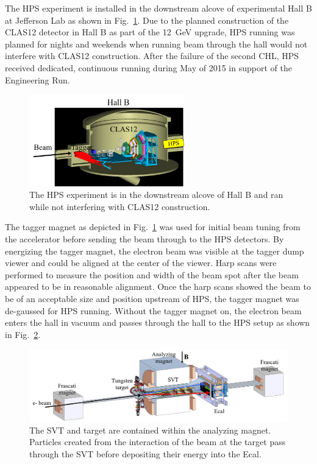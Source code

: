 The HPS experiment is installed in the downstream alcove of experimental Hall B at Jefferson Lab as shown in Fig.~\ref{Figure:hallB}. Due to the planned construction of the CLAS12 detector in Hall B as part of the 12~GeV upgrade, HPS running was planned for nights and weekends when running beam through the hall would not interfere with CLAS12 construction. After the failure of the second CHL, HPS received dedicated, continuous running during May of 2015 in support of the Engineering Run. 

\begin{figure}[H]
  \centering
      \includegraphics[width=0.6\textwidth]{pics/experiment/hallB.png}
  \caption[HPS location in Hall B]{The HPS experiment is in the downstream alcove of Hall B and ran while not interfering with CLAS12 construction.}
  \label{Figure:hallB}
\end{figure}

The tagger magnet as depicted in Fig.~\ref{Figure:hallB} was used for initial beam tuning from the accelerator before sending the beam through to the HPS detectors. By energizing the tagger magnet, the electron beam was visible at the tagger dump viewer and could be aligned at the center of the viewer. Harp scans were performed to measure the position and width of the beam spot after the beam appeared to be in reasonable alignment. Once the harp scans showed the beam to be of an acceptable size and position upstream of HPS, the tagger magnet was de-gaussed for HPS running. Without the tagger magnet on, the electron beam enters the hall in vacuum and passes through the hall to the HPS setup as shown in Fig.~\ref{Figure:hpsBeamline}. 

\begin{figure}[H]
  \centering
      \includegraphics[width=1.0\textwidth]{pics/experiment/hpsBeamline.png}
  \caption[HPS beamline]{The SVT and target are contained within the analyzing magnet. Particles created from the interaction of the beam at the target pass through the SVT before depositing their energy into the Ecal.}
  \label{Figure:hpsBeamline}
\end{figure}

